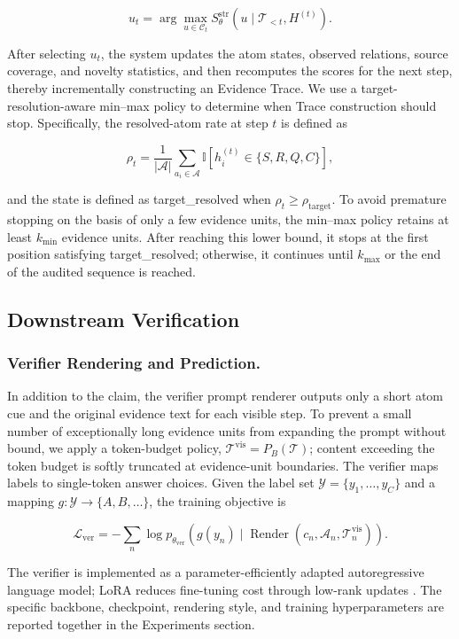 \documentclass[letterpaper]{article}
\begin{document}
\[
u_t=\arg\max_{u\in\mathcal C_t}
S_\theta^{\mathrm{str}}(u\mid\mathcal T_{<t},H^{(t)}).
\]

After selecting $u_t$, the system updates the atom states, observed relations, source coverage, and novelty statistics, and then recomputes the scores for the next step, thereby incrementally constructing an Evidence Trace. We use a target-resolution-aware min--max policy to determine when Trace construction should stop. Specifically, the resolved-atom rate at step \(t\) is defined as

\[
\rho_t=\frac{1}{|\mathcal A|}\sum_{a_i\in\mathcal A}
\mathbb{I}\!\left[h_i^{(t)}\in\{S,R,Q,C\}\right],
\]

and the state is defined as target\_resolved when $\rho_t\ge\rho_{\mathrm{target}}$. To avoid premature stopping on the basis of only a few evidence units, the min--max policy retains at least $k_{\min}$ evidence units. After reaching this lower bound, it stops at the first position satisfying target\_resolved; otherwise, it continues until $k_{\max}$ or the end of the audited sequence is reached.

\subsection{Downstream Verification}

\subsubsection{Verifier Rendering and Prediction.}

In addition to the claim, the verifier prompt renderer outputs only a short atom cue and the original evidence text for each visible step. To prevent a small number of exceptionally long evidence units from expanding the prompt without bound, we apply a token-budget policy, $\mathcal T^{\mathrm{vis}}=P_B(\mathcal T)$; content exceeding the token budget is softly truncated at evidence-unit boundaries. The verifier maps labels to single-token answer choices. Given the label set $\mathcal Y=\{y_1,\ldots,y_C\}$ and a mapping $g:\mathcal Y\rightarrow\{A,B,\ldots\}$, the training objective is

\[
\mathcal L_{\mathrm{ver}}=-\sum_n
\log p_{\theta_{\mathrm{ver}}}\left(g(y_n)\mid
\operatorname{Render}(c_n,\mathcal A_n,\mathcal T_n^{\mathrm{vis}})\right).
\]

The verifier is implemented as a parameter-efficiently adapted autoregressive language model; LoRA reduces fine-tuning cost through low-rank updates \citep{Hu2022LoRA}. The specific backbone, checkpoint, rendering style, and training hyperparameters are reported together in the Experiments section.
\end{document}
